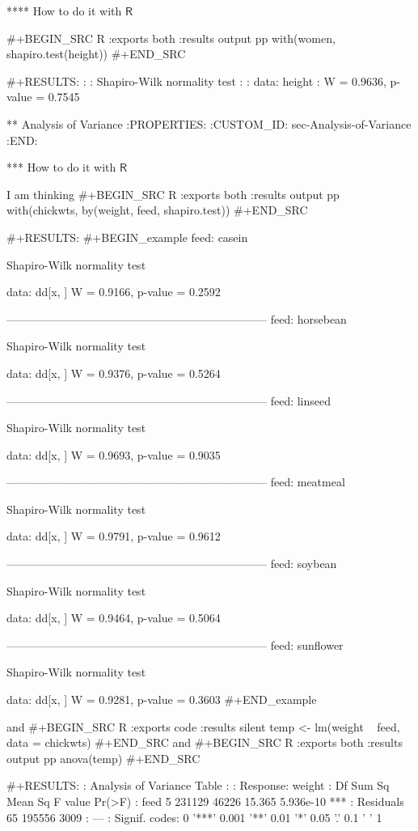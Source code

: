 **** How to do it with \(\mathsf{R}\)

#+BEGIN_SRC R :exports both :results output pp 
with(women, shapiro.test(height))
#+END_SRC

#+RESULTS:
: 
: 	Shapiro-Wilk normality test
: 
: data:  height
: W = 0.9636, p-value = 0.7545

** Analysis of Variance
:PROPERTIES:
:CUSTOM_ID: sec-Analysis-of-Variance
:END:

*** How to do it with \(\mathsf{R}\)

I am thinking 
#+BEGIN_SRC R :exports both :results output pp 
with(chickwts, by(weight, feed, shapiro.test))
#+END_SRC

#+RESULTS:
#+BEGIN_example
feed: casein

	Shapiro-Wilk normality test

data:  dd[x, ]
W = 0.9166, p-value = 0.2592

--------------------------------------------------------------------- 
feed: horsebean

	Shapiro-Wilk normality test

data:  dd[x, ]
W = 0.9376, p-value = 0.5264

--------------------------------------------------------------------- 
feed: linseed

	Shapiro-Wilk normality test

data:  dd[x, ]
W = 0.9693, p-value = 0.9035

--------------------------------------------------------------------- 
feed: meatmeal

	Shapiro-Wilk normality test

data:  dd[x, ]
W = 0.9791, p-value = 0.9612

--------------------------------------------------------------------- 
feed: soybean

	Shapiro-Wilk normality test

data:  dd[x, ]
W = 0.9464, p-value = 0.5064

--------------------------------------------------------------------- 
feed: sunflower

	Shapiro-Wilk normality test

data:  dd[x, ]
W = 0.9281, p-value = 0.3603
#+END_example

and
#+BEGIN_SRC R :exports code :results silent 
temp <- lm(weight ~ feed, data = chickwts)
#+END_SRC
and 
#+BEGIN_SRC R :exports both :results output pp 
anova(temp)
#+END_SRC

#+RESULTS:
: Analysis of Variance Table
: 
: Response: weight
:           Df Sum Sq Mean Sq F value    Pr(>F)    
: feed       5 231129   46226  15.365 5.936e-10 ***
: Residuals 65 195556    3009                      
: ---
: Signif. codes:  0 '***' 0.001 '**' 0.01 '*' 0.05 '.' 0.1 ' ' 1

